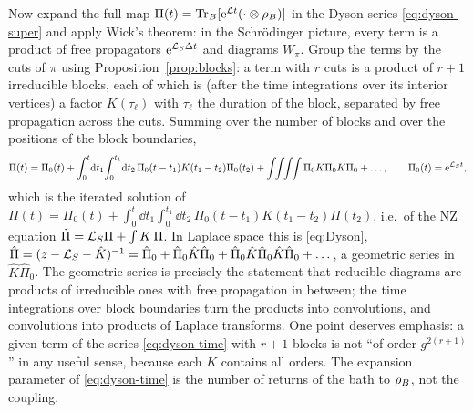 Now expand the full map $\Pi(t)=\operatorname{Tr}_B[\mathrm{e}^{\mathcal{L} t}(\cdot\otimes\rho_{B})]$ in the Dyson series \eqref{eq:dyson-super} and apply Wick's theorem: in the Schr\"odinger picture, every term is a product of free propagators $\mathrm{e}^{\mathcal{L}_S\Delta t}$ and diagrams $W_\pi$.
Group the terms by the cuts of $\pi$ using Proposition~\ref{prop:blocks}: a term with $r$ cuts is a product of $r+1$ irreducible blocks, each of which is (after the time integrations over its interior vertices) a factor $K(\tau_\ell)$ with $\tau_\ell$ the duration of the block, separated by free propagation across the cuts.
Summing over the number of blocks and over the positions of the block boundaries,
\begin{equation}
  \Pi(t)=\Pi_0(t)+\int_0^t\!\dd t_1\!\int_0^{t_1}\!\dd t_2\,\Pi_0(t-t_1)K(t_1-t_2)\Pi_0(t_2)
  +\int\!\!\int\!\!\int\!\!\int\Pi_0K\Pi_0K\Pi_0+\dots ,\qquad \Pi_0(t)=\ee^{\Lc_St},
  \label{eq:dyson-time}
\end{equation}
which is the iterated solution of $\Pi(t)=\Pi_0(t)+\int_0^t\dd t_1\int_0^{t_1}\dd t_2\,\Pi_0(t-t_1)K(t_1-t_2)\Pi(t_2)$, i.e.\ of the NZ equation $\dot\Pi=\mathcal{L}_S\Pi+\int K\,\Pi$.
In Laplace space this is \cref{eq:Dyson}, $\hat\Pi=(z-\mathcal{L}_S-\hat K)^{-1}=\hat\Pi_0+\hat\Pi_0\hat K\hat\Pi_0+\hat\Pi_0\hat K\hat\Pi_0\hat K\hat\Pi_0+\dots$, a geometric series in $\hat K\hat\Pi_0$.
The geometric series is precisely the statement that reducible diagrams are products of irreducible ones with free propagation in between; the time integrations over block boundaries turn the products into convolutions, and convolutions into products of Laplace transforms.
One point deserves emphasis: a given term of the series \eqref{eq:dyson-time} with $r+1$ blocks is not ``of order $g^{2(r+1)}$'' in any useful sense, because each $K$ contains all orders.
The expansion parameter of \cref{eq:dyson-time} is the number of returns of the bath to $\rho_{B}$, not the coupling.

